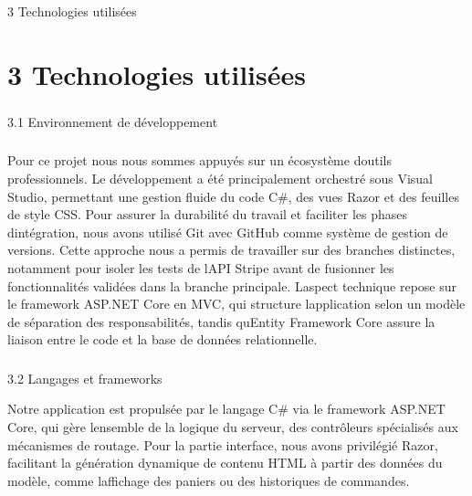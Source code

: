 \documentclass[
]{article}
\begin{document}
3 Technologies utilisées

\section{3 Technologies utilisées}\label{technologies-utilisuxe9es}

\subsubsection{}\label{section-3}

3.1 Environnement de développement

\subsubsection{}\label{section-4}

Pour ce projet nous nous sommes appuyés sur un écosystème
d\textquotesingle outils professionnels. Le développement a été
principalement orchestré sous Visual Studio, permettant une gestion
fluide du code C\#, des vues Razor et des feuilles de style CSS. Pour
assurer la durabilité du travail et faciliter les phases
d\textquotesingle intégration, nous avons utilisé Git avec GitHub comme
système de gestion de versions. Cette approche nous a permis de
travailler sur des branches distinctes, notamment pour isoler les tests
de l\textquotesingle API Stripe avant de fusionner les fonctionnalités
validées dans la branche principale. L\textquotesingle aspect technique
repose sur le framework ASP.NET Core en MVC, qui structure
l\textquotesingle application selon un modèle de séparation des
responsabilités, tandis qu\textquotesingle Entity Framework Core assure
la liaison entre le code et la base de données relationnelle.

\subsubsection{}\label{section-5}

3.2 Langages et frameworks

Notre application est propulsée par le langage C\# via le framework
ASP.NET Core, qui gère l\textquotesingle ensemble de la logique du
serveur, des contrôleurs spécialisés aux mécanismes de routage. Pour la
partie interface, nous avons privilégié Razor, facilitant la génération
dynamique de contenu HTML à partir des données du modèle, comme
l\textquotesingle affichage des paniers ou des historiques de commandes.
\end{document}
